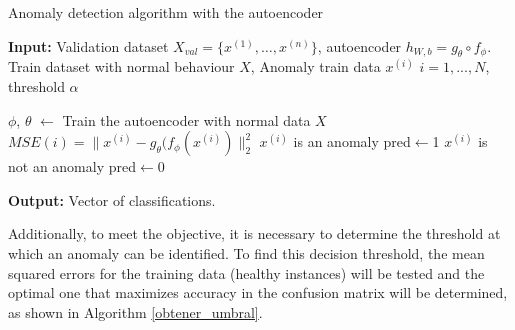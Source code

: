 \documentclass{iosart2c}
\begin{document}
\begin{algorithm}[h!]
\caption{Anomaly detection algorithm with the autoencoder}\label{autoencoder_anomalias}
\textbf{Input:} Validation dataset $X_{val}=\{x^{(1)},\ldots,x^{(n)}\}$, autoencoder $h_{W,b}=g_\theta \circ f_\phi$.\\ Train dataset with normal behaviour  $X$, Anomaly train data $x^{(i)}$ $i = 1,...,N$, threshold $\alpha$\\
\begin{algorithmic}[1]
\State $\phi$, $\theta$ $\xleftarrow{}$ Train the autoencoder with normal data $X$
    \State $MSE(i) = \lVert x^{(i)} - g_\theta(f_\phi(x^{(i)})\rVert_2^2$ 
        \State$x^{(i)}$ is an anomaly
        \State pred$\xleftarrow{}$1
    \Else 
        \State$x^{(i)}$ is not an anomaly
        \State pred$\xleftarrow{}$0
    \EndIf
\EndFor
\end{algorithmic}
\textbf{Output:} Vector of classifications.\\
\end{algorithm}


Additionally, to meet the objective, it is necessary to determine the threshold at which an anomaly can be identified. To find this decision threshold, the mean squared errors for the training data (healthy instances) will be tested and the optimal one that maximizes accuracy in the confusion matrix will be determined, as shown in Algorithm \ref{obtener_umbral}.
\end{document}

